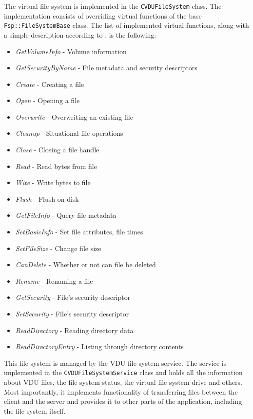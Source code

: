 The virtual file system is implemented in the \lstinline{CVDUFileSystem} class. The implementation consists of overriding virtual functions of the base \lstinline{Fsp::FileSystemBase} class. The list of implemented virtual functions, along with a simple description according to \cite{WinFspTutorial}, is the following:
\begin{itemize}
    \item \textit{GetVolumeInfo} - Volume information
    \item \textit{GetSecurityByName} - File metadata and security descriptors
    \item \textit{Create} - Creating a file
    \item \textit{Open} - Opening a file
    \item \textit{Overwrite} - Overwriting an existing file
    \item \textit{Cleanup} - Situational file operations
    \item \textit{Close} - Closing a file handle
    \item \textit{Read} - Read bytes from file
    \item \textit{Wite} - Write bytes to file
    \item \textit{Flush} - Flush on disk
    \item \textit{GetFileInfo} - Query file metadata
    \item \textit{SetBasicInfo} - Set file attributes, file times
    \item \textit{SetFileSize} - Change file size
    \item \textit{CanDelete} - Whether or not can file be deleted
    \item \textit{Rename} - Renaming a file
    \item \textit{GetSecurity} - File's security descriptor
    \item \textit{SetSecurity} - File's security descriptor
    \item \textit{ReadDirectory} - Reading directory data
    \item \textit{ReadDirectoryEntry} - Listing through directory contents
\end{itemize}
This file system is managed by the VDU file system service. The service is implemented in the \lstinline{CVDUFileSystemService} class and holds all the information about VDU files, the file system status, the virtual file system drive and others. Most importantly, it implements functionality of transferring files between the client and the server and provides it to other parts of the application, including the file system itself.

